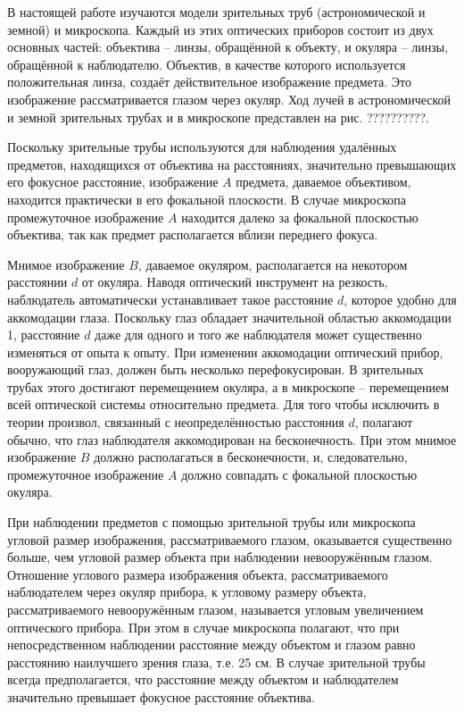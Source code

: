 В настоящей работе изучаются модели зрительных труб (астрономической и земной) и микроскопа. 
Каждый из этих оптических приборов состоит из двух основных частей: объектива -- линзы, 
обращённой к объекту, и окуляра -- линзы, обращённой к наблюдателю. Объектив, в качестве 
которого используется положительная линза, создаёт действительное изображение предмета. 
Это изображение рассматривается глазом через окуляр. Ход лучей в астрономической
и земной зрительных трубах и в микроскопе представлен на рис. ??????????.

Поскольку зрительные трубы используются для наблюдения удалённых предметов, находящихся
от объектива на расстояниях, значительно превышающих его фокусное расстояние, изображение
$A$ предмета, даваемое объективом, находится практически в его фокальной плоскости. В 
случае микроскопа промежуточное изображение $A$ находится далеко за фокальной плоскостью
объектива, так как предмет располагается вблизи переднего фокуса.

Мнимое изображение $B$, даваемое окуляром, располагается на некотором расстоянии $d$ от 
окуляра. Наводя оптический инструмент на резкость, наблюдатель автоматически устанавливает
такое расстояние $d$, которое удобно для аккомодации глаза. Поскольку глаз обладает 
значительной областью аккомодации 1, расстояние $d$ даже для одного и того же наблюдателя
может существенно изменяться от опыта к опыту. При изменении аккомодации оптический прибор, 
вооружающий глаз, должен быть несколько перефокусирован. В зрительных трубах этого достигают 
перемещением окуляра, а в микроскопе -- перемещением всей оптической системы относительно 
предмета. Для того чтобы исключить в теории произвол, связанный с неопределённостью 
расстояния $d$, полагают обычно, что глаз наблюдателя аккомодирован на бесконечность.
При этом мнимое изображение $B$ должно располагаться в бесконечности, и, следовательно,
промежуточное изображение $A$ должно совпадать с фокальной плоскостью окуляра.

При наблюдении предметов с помощью зрительной трубы или микроскопа угловой размер 
изображения, рассматриваемого глазом, оказывается существенно больше, чем угловой размер 
объекта при наблюдении невооружённым глазом. Отношение углового размера изображения 
объекта, рассматриваемого наблюдателем через окуляр прибора, к угловому размеру объекта, 
рассматриваемого невооружённым глазом, называется угловым увеличением оптического прибора. 
При этом в случае микроскопа полагают, что при непосредственном наблюдении расстояние 
между объектом и глазом равно расстоянию наилучшего зрения глаза, т.е. 25 см. В случае 
зрительной трубы всегда предполагается, что расстояние между объектом и наблюдателем 
значительно превышает фокусное расстояние объектива.